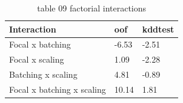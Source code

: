 \begin{table}[t]
\centering
\caption{table 09 factorial interactions}
\label{tab:factorial_interactions}
\begin{tabular}{lll}
\hline
Interaction & oof & kddtest \\
\hline
Focal x batching & -6.53 & -2.51 \\
Focal x scaling & 1.09 & -2.28 \\
Batching x scaling & 4.81 & -0.89 \\
Focal x batching x scaling & 10.14 & 1.81 \\
\hline
\end{tabular}
\end{table}
